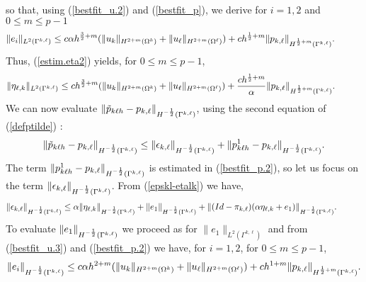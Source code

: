 \documentclass[final]{siamltex}
\begin{document}
so that, using (\ref{bestfit_u.2}) and (\ref{bestfit_p}), we derive
for $i=1,2$ and $0\le m\le p-1$
\begin{eqnarray}\label{estim.ei}
\| e_i \|_{L^2(\Gamma^{k,\ell})}
\le c \alpha h^{{3 \over 2}+m}
(\|u_k\|_{H^{2+m}(\Omega^k)}+\|u_{\ell}\|_{H^{2+m}(\Omega^{\ell})})
+ch^{{1 \over 2}+m}
\| p_{k,\ell} \|_{H^{{1 \over 2}+m}(\Gamma^{k,\ell})}.\hspace{10mm}
\end{eqnarray}
Thus, (\ref{estim.eta2}) yields, for $0\le m \le p-1$,
\begin{eqnarray}\label{estim.eta3}
\|\eta_{\ell,k} \|_{L^2(\Gamma^{k,\ell})}
\le c h^{{3 \over 2}+m}
(\|u_k\|_{H^{2+m}(\Omega^k)}+\|u_{\ell}\|_{H^{2+m}(\Omega^{\ell})})
+{ch^{{1 \over 2}+m} \over \alpha}
\| p_{k,\ell} \|_{H^{{1 \over 2}+m}(\Gamma^{k,\ell})}.\hspace{10mm}
\end{eqnarray}
We can now evaluate $\| \tilde{p}_{k \ell h} - p_{k,\ell} \|_{H^{-{1 \over
2}}(\Gamma^{k,\ell})}$, using the second equation of (\ref{defptilde}) :
\begin{eqnarray}\label{eval1}
\| \tilde{p}_{k \ell h} - p_{k,\ell} \|_{H^{-{1 \over 2}}(\Gamma^{k,\ell})}
\le \| \epsilon_{k,\ell} \|_{H^{-{1 \over 2}}(\Gamma^{k,\ell})}
+ \| p_{k \ell h}^1 - p_{k,\ell} \|_{H^{-{1 \over 2}}(\Gamma^{k,\ell})}.
\end{eqnarray}
The term $\| p_{k \ell h}^1 - p_{k,\ell} \|_{H^{-{1 \over
      2}}(\Gamma^{k,\ell})}$ is estimated in (\ref{bestfit_p.2}), so
let us focus on the term $\| \epsilon_{k,\ell} \|_{H^{-{1 \over
      2}}(\Gamma^{k,\ell})}$.  From (\ref{epskl-etalk}) we have,
\begin{eqnarray}\label{majoeps}
  \| \epsilon_{k,\ell} \|_{H^{-{1 \over 2}}(\Gamma^{k,\ell})}
\le \alpha\|\eta_{\ell,k} \|_{H^{-{1 \over 2}}(\Gamma^{k,\ell})}
+\|e_1 \|_{H^{-{1 \over 2}}(\Gamma^{k,\ell})}
+ \|(Id-\pi_{k,\ell})(\alpha \eta_{\ell,k} +e_1) \|_{H^{-{1 \over
2}}(\Gamma^{k,\ell})}.\hspace{10mm}
\end{eqnarray}
To evaluate $\|e_1 \|_{H^{-{1 \over 2}}(\Gamma^{k,\ell})}$ we proceed
as for $\|e_1 \|_{L^2(\Gamma^{k,\ell})}$ and from (\ref{bestfit_u.3})
and (\ref{bestfit_p.2}) we have, for $i=1,2$, for $0\le m \le p-1$,
\begin{eqnarray}\label{estim.ei.2}
\|e_i \|_{H^{-{1 \over 2}}(\Gamma^{k,\ell})}
\le c \alpha h^{2+m}
(\|u_k\|_{H^{2+m}(\Omega^k)}+\|u_{\ell}\|_{H^{2+m}(\Omega^{\ell})})
+ch^{1+m} \| p_{k,\ell} \|_{H^{{1 \over 2}+m}(\Gamma^{k,\ell})}.\nonumber
\end{eqnarray}
\end{document}
